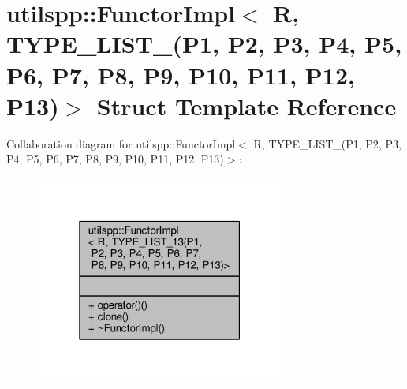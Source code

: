 \hypertarget{structutilspp_1_1FunctorImpl_3_01R_00_01TYPE__LIST__13_07P1_00_01P2_00_01P3_00_01P4_00_01P5_00_0c958a377a1633cfded06d0625afe62c5}{\section{utilspp\-:\-:Functor\-Impl$<$ R, T\-Y\-P\-E\-\_\-\-L\-I\-S\-T\-\_(P1, P2, P3, P4, P5, P6, P7, P8, P9, P10, P11, P12, P13)$>$ Struct Template Reference}
\label{structutilspp_1_1FunctorImpl_3_01R_00_01TYPE__LIST__13_07P1_00_01P2_00_01P3_00_01P4_00_01P5_00_0c958a377a1633cfded06d0625afe62c5}
}


Collaboration diagram for utilspp\-:\-:Functor\-Impl$<$ R, T\-Y\-P\-E\-\_\-\-L\-I\-S\-T\-\_(P1, P2, P3, P4, P5, P6, P7, P8, P9, P10, P11, P12, P13)$>$\-:\nopagebreak
\begin{figure}[H]
\begin{center}
\leavevmode
\includegraphics[width=232pt]{structutilspp_1_1FunctorImpl_3_01R_00_01TYPE__LIST__13_07P1_00_01P2_00_01P3_00_01P4_00_01P5_00_0449d2a2be1bee786ba21febad7177958}
\end{center}
\end{figure}
